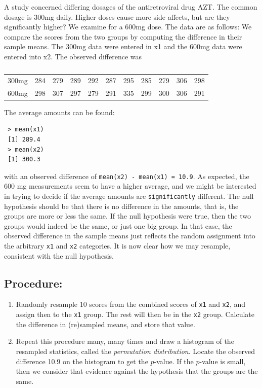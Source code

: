 \documentclass[captions=tableheading]{scrbook}
\begin{document}
\begin{example}
A study concerned differing dosages of the antiretroviral drug AZT. The common dosage is 300mg daily. Higher doses cause more side affects, but are they significantly higher? We examine for a 600mg dose. The data are as follows: We compare the scores from the two groups by computing the difference in their sample means. The 300mg data were entered in x1 and the 600mg data were entered into x2. The observed difference was

\begin{table}[htb]
\caption{} \label{exa-percentile-interval-median-first}
\begin{center}
\begin{tabular}{lrrrrrrrrrr}
 300mg  &  284  &  279  &  289  &  292  &  287  &  295  &  285  &  279  &  306  &  298  \\
 600mg  &  298  &  307  &  297  &  279  &  291  &  335  &  299  &  300  &  306  &  291  \\
\end{tabular}
\end{center}
\end{table}


The average amounts can be found:
\begin{verbatim}
 > mean(x1)
 [1] 289.4
 > mean(x2)
 [1] 300.3
\end{verbatim}

with an observed difference of \texttt{mean(x2) - mean(x1) = 10.9}. As expected, the 600 mg measurements seem to have a higher average, and we might be interested in trying to decide if the average amounts are \texttt{significantly} different. The null hypothesis should be that there is no difference in the amounts, that is, the groups are more or less the same. If the null hypothesis were true, then the two groups would indeed be the same, or just one big group. In that case, the observed difference in the sample means just reflects the random assignment into the arbitrary \texttt{x1} and \texttt{x2} categories. It is now clear how we may resample, consistent with the null hypothesis.
\subsection{Procedure:}
\label{sec-13-4-1}


\begin{enumerate}
\item Randomly resample 10 scores from the combined scores of \texttt{x1} and \texttt{x2}, and assign then to the \texttt{x1} group. The rest will then be in the \texttt{x2} group. Calculate the difference in (re)sampled means, and store that value.
\item Repeat this procedure many, many times and draw a histogram of the resampled statistics, called the \emph{permutation distribution}. Locate the observed difference 10.9 on the histogram to get the \(p\)-value. If the \(p\)-value is small, then we consider that evidence against the hypothesis that the groups are the same.
\end{enumerate}


\end{example}
\end{document}
